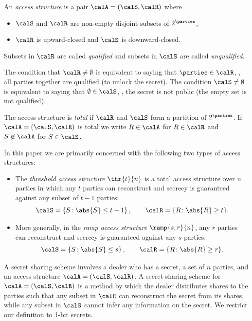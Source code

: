 \documentclass{toc}
\begin{document}
\begin{definition}   \label{def:accessstructure}
%
An \emph{access structure} is a pair $\calA = (\calS, \calR)$
where
\begin{itemize}
\item[(i)] $\calS$ and $\calR$ are non-empty disjoint subsets of $2^\parties$,
\item[(ii)] $\calR$ is upward-closed and $\calS$ is downward-closed.
\end{itemize}  
Subsets in $\calR$ are called \emph{qualified} and subsets
in $\calS$ are called \emph{unqualified}.
\end{definition}
\begin{remark}    \label{rem:closed}
The condition that $\calR\neq\emptyset$
is equivalent to saying that $\parties\in\calR$, \ie,
all parties together are qualified (to unlock the
secret).  The condition $\calS\neq\emptyset$ 
is equivalent to saying that $\emptyset\in\calS$, \ie,
the secret is not public (the empty set is
not qualified).
\end{remark}  

The access structure is \emph{total} if $\calR$ and $\calS$ form a partition of
$2^{\parties}$.  If $\calA = (\calS, \calR)$ is total we write $R \in \calA$ for
$R \in \calR$ and $S \not\in \calA$ for $S \in \calS$.

In this paper we are primarily concerned with 
the following two types of access structures:

\begin{itemize}
\item The \emph{threshold access structure} $\thr{t}{n}$ is a total access structure over $n$ parties in which any $t$ parties can reconstruct and secrecy is guaranteed against any subset of $t - 1$ parties:
\[ \calS = \{S\colon \abs{S} \leq t - 1\}\,, \qquad \calR = \{R\colon \abs{R} \geq t\}. \]
\item More generally, in the \emph{ramp access structure} $\ramp{s,r}{n}$, any $r$ parties can reconstruct and secrecy is guaranteed against any $s$ parties:
\[ \calS = \{S\colon \abs{S} \leq s\}\,, \qquad \calR = \{R\colon \abs{R} \geq r\}. \]
\end{itemize}

A secret sharing scheme involves a dealer who has a secret, a set of $n$
parties, and an
%
%
access structure $\calA = (\calS,\calR)$. A secret sharing scheme for $\calA=(\calS,\calR)$ is a method by
which the dealer distributes shares to the parties such that any subset in
$\calR$ can reconstruct the secret from its shares, while any subset in $\calS$
cannot infer any information on the secret.  We restrict our definition to
1-bit secrets.
\end{document}
